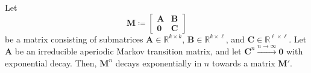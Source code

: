 \documentclass[../../main.tex]{subfiles}
\begin{document}
    \begin{lemma}
        \label{lemma:exponential_convergence_with_open_states}
        Let
        \[
            \bm{M} \coloneqq
            \begin{bmatrix}
                \bm{A} & \bm{B} \\
                \bm{0} & \bm{C}
            \end{bmatrix}
        \]
        be a matrix consisting of submatrices \( \bm{A} \in \mathbb{R}^{k \times k} \), \( \bm{B} \in \mathbb{R}^{k \times \ell} \), and \( \bm{C} \in \mathbb{R}^{\ell \times \ell} \). Let $\bm{A}$ be an irreducible aperiodic Markov transition matrix, and let $\bm{C}^n \xrightarrow{n \to \infty} \bm{0}$ with exponential decay.
        Then, $\bm{M}^n$ decays exponentially in $n$ towards a matrix $\bm{M}'$.
    \end{lemma}
    \vspace{-2.5em}
\end{document}

